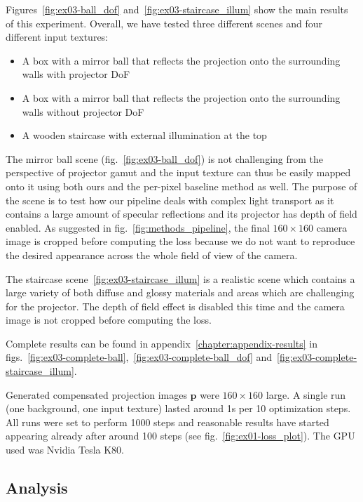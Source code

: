 Figures~\ref{fig:ex03-ball_dof} and~\ref{fig:ex03-staircase_illum} show the main results of this experiment. Overall, we have tested three different scenes and four different input textures:

\begin{itemize}
    \item A box with a mirror ball that reflects the projection onto the surrounding walls with projector DoF
    \item A box with a mirror ball that reflects the projection onto the surrounding walls without projector DoF
    \item A wooden staircase with external illumination at the top
\end{itemize}

The mirror ball scene (fig.~\ref{fig:ex03-ball_dof}) is not challenging from the perspective of projector gamut and the input texture can thus be easily mapped onto it using both ours and the per-pixel baseline method as well. The purpose of the scene is to test how our pipeline deals with complex light transport as it contains a large amount of specular reflections and its projector has depth of field enabled. As suggested in fig.~\ref{fig:methods_pipeline}, the final \(160 \times 160\) camera image is cropped before computing the loss because we do not want to reproduce the desired appearance across the whole field of view of the camera.

The staircase scene~\ref{fig:ex03-staircase_illum} is a realistic scene which contains a large variety of both diffuse and glossy materials and areas which are challenging for the projector. The depth of field effect is disabled this time and the camera image is not cropped before computing the loss.

Complete results can be found in appendix~\ref{chapter:appendix-results} in figs.~\ref{fig:ex03-complete-ball},~\ref{fig:ex03-complete-ball_dof} and~\ref{fig:ex03-complete-staircase_illum}.

Generated compensated projection images \(\bm{p}\) were \(160 \times 160\) large. A single run (one background, one input texture) lasted around 1s per 10 optimization steps. All runs were set to perform 1000 steps and reasonable results have started appearing already after around 100 steps (see fig.~\ref{fig:ex01-loss_plot}). The GPU used was Nvidia Tesla K80.

\subsection{Analysis}
\label{section:results-experiments-03-analysis}

